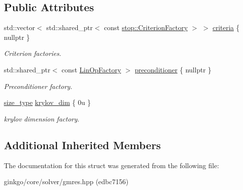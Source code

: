 \subsection*{Public Attributes}
\begin{DoxyCompactItemize}
\item 
\mbox{\label{structgko_1_1solver_1_1Gmres_1_1parameters__type_a7e00d428588b7bcac078083cb03c56c2}} 
std\+::vector$<$ std\+::shared\+\_\+ptr$<$ const \hyperlink{namespacegko_1_1stop_ab12a51109c50b35ec36dc5a393d6a9a0}{stop\+::\+Criterion\+Factory} $>$ $>$ \hyperlink{structgko_1_1solver_1_1Gmres_1_1parameters__type_a7e00d428588b7bcac078083cb03c56c2}{criteria} \{ nullptr \}
\begin{DoxyCompactList}\small\item\em Criterion factories. \end{DoxyCompactList}\item 
\mbox{\label{structgko_1_1solver_1_1Gmres_1_1parameters__type_ae20afde8c9429953030e86efd37b0953}} 
std\+::shared\+\_\+ptr$<$ const \hyperlink{classgko_1_1LinOpFactory}{Lin\+Op\+Factory} $>$ \hyperlink{structgko_1_1solver_1_1Gmres_1_1parameters__type_ae20afde8c9429953030e86efd37b0953}{preconditioner} \{ nullptr \}
\begin{DoxyCompactList}\small\item\em Preconditioner factory. \end{DoxyCompactList}\item 
\mbox{\label{structgko_1_1solver_1_1Gmres_1_1parameters__type_a5b88f3758ea7c21c535041289e1b09ce}} 
\hyperlink{namespacegko_a6e5c95df0ae4e47aab2f604a22d98ee7}{size\+\_\+type} \hyperlink{structgko_1_1solver_1_1Gmres_1_1parameters__type_a5b88f3758ea7c21c535041289e1b09ce}{krylov\+\_\+dim} \{ 0u \}
\begin{DoxyCompactList}\small\item\em krylov dimension factory. \end{DoxyCompactList}\end{DoxyCompactItemize}
\subsection*{Additional Inherited Members}


The documentation for this struct was generated from the following file\+:\begin{DoxyCompactItemize}
\item 
ginkgo/core/solver/gmres.\+hpp (edbc7156)\end{DoxyCompactItemize}
